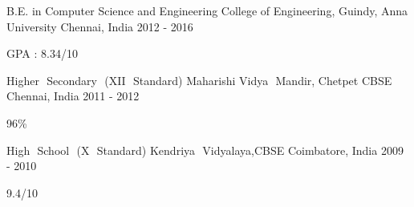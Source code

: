 

\begin{cventries}

  \cventry
    {B.E. in Computer Science and Engineering} %
    {College of Engineering, Guindy, Anna University} %
    {Chennai, India} %
    {2012 - 2016} %
    {
      \begin{cvitems} %
        \item {GPA : 8.34/10}
      \end{cvitems}
    }
  \cventry
    {Higher​ ​ Secondary​ ​ (XII​ ​ Standard)} %
    {Maharishi​ ​ Vidya​ ​ Mandir,​ Chetpet​ CBSE} %
    {Chennai, India} %
    {2011 - 2012} %
    {
      \begin{cvitems} %
        \item {96\%}
      \end{cvitems}
    }
  \cventry
    {High​ ​ School​ ​ (X​ ​ Standard)} %
    {Kendriya​ ​ Vidyalaya,​​ CBSE} %
    {Coimbatore, India} %
    {2009 - 2010} %
    {
      \begin{cvitems} %
        \item {9.4/10}
      \end{cvitems}
    }

\end{cventries}
